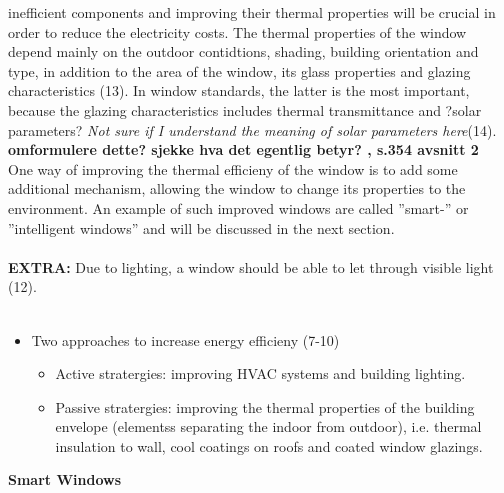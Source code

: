 inefficient components \cite{Baetens2010} and improving their thermal properties will be crucial in order
to reduce the electricity costs.
%
The thermal properties of the window depend mainly on
the outdoor contidtions, shading, building orientation and type, in addition to the
area of the window, its glass properties and glazing characteristics (13). In window standards,
the latter is the most important, because the glazing characteristics includes thermal transmittance
and ?solar parameters? \textit{Not sure if I understand the meaning of solar parameters here}(14).
\textbf{omformulere dette? sjekke hva det egentlig betyr?
\cite{Kamalisarvestani2013}, s.354 avsnitt 2 }\\
One way of improving the thermal efficieny of the window is to add some additional mechanism,
allowing the window to change its properties to the environment. An example of such improved 
windows are called ''smart-'' or ''intelligent windows'' and will be discussed in the next section.
\\
\\
\textbf{EXTRA:} Due to lighting, a window should be able to let through visible light (12).
\\
\\
\begin{itemize}
\item Two approaches to increase energy efficieny (7-10)
   \begin{itemize}
      \item Active stratergies: improving HVAC systems and building lighting.
      \item Passive stratergies: improving the thermal properties of the building envelope (elementss
         separating the indoor from outdoor), i.e. thermal insulation to wall, cool coatings on roofs
                  and coated window glazings.
   \end{itemize}
\end{itemize}
\textbf{Smart Windows}

